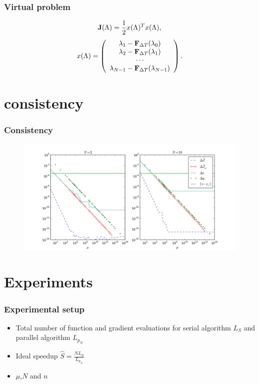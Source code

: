\documentclass[9pt]{beamer}
\begin{document}
\begin{frame}
\frametitle{Virtual problem}

 \begin{align}
\bold J(\Lambda) = \frac{1}{2} x(\Lambda)^Tx(\Lambda), \label{non_lin_LS}
\end{align}
\begin{align}
x(\Lambda)=\left( \begin{array}{c}  
   \lambda_1 - \bold F_{\Delta T}(\lambda_0) \\ 
   \lambda_2 - \bold F_{\Delta T}(\lambda_1) \\
   \cdots  \\
   \lambda_{N-1} -\bold F_{\Delta T}(\lambda_{N-1}) \\
   \end{array}  \right).
\end{align}

\end{frame}
\section{consistency}
\begin{frame}
\frametitle{Consistency}
\begin{figure}[!h]
\centering
\includegraphics[scale=0.4]{consistency1.png}

\end{figure}
\end{frame}
\section{Experiments}
\begin{frame}
\frametitle{Experimental setup}
\begin{itemize}
\item<1->{Total number of function and gradient evaluations for serial algorithm $L_S$ and parallel algorithm $L_{p_N}$}
\item<1->{Ideal speedup $\hat{S}=\frac{N L_S}{L_{p_N}}$}
\item<2->{$\mu$,$N$ and $n$}
\end{itemize}
\end{frame}
\end{document}
